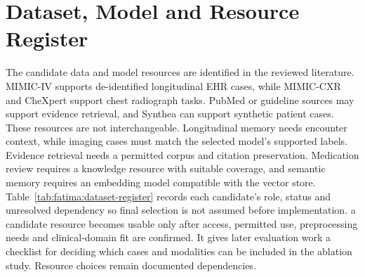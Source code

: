 \section{Dataset, Model and Resource Register}

The candidate data and model resources are identified in the reviewed literature. MIMIC-IV supports de-identified longitudinal EHR cases, while MIMIC-CXR and CheXpert support chest radiograph tasks. PubMed or guideline sources may support evidence retrieval, and Synthea can support synthetic patient cases.~\cite{zeestA:mimicIV,zeestB:mimiccxr,zeestB:chexpert,zeestB:synthea} These resources are not interchangeable. Longitudinal memory needs encounter context, while imaging cases must match the selected model's supported labels. Evidence retrieval needs a permitted corpus and citation preservation. Medication review requires a knowledge resource with suitable coverage, and semantic memory requires an embedding model compatible with the vector store. Table~\ref{tab:fatima:dataset-register} records each candidate's role, status and unresolved dependency so final selection is not assumed before implementation. a candidate resource becomes usable only after access, permitted use, preprocessing needs and clinical-domain fit are confirmed. It gives later evaluation work a checklist for deciding which cases and modalities can be included in the ablation study. Resource choices remain documented dependencies.


